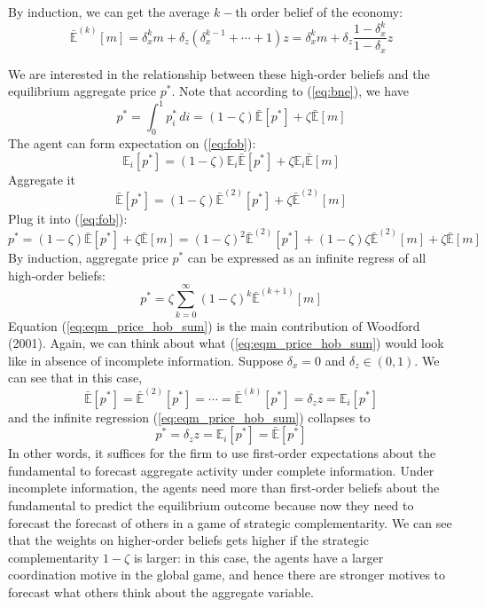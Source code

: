 \documentclass[12pt]{article}
\begin{document}
By induction, we can get the average $k-$th order belief of the economy:
\begin{equation}
	\bar{\mathbb{E}}^{(k)}[m] = \delta_x^k m + \delta_z(\delta_x^{k-1} + \cdots + 1)z = \delta_x^k m + \delta_z \frac{1 - \delta_x^{k}}{1-\delta_x}z
\end{equation}

We are interested in the relationship between these high-order beliefs and the equilibrium aggregate price $p^*$. Note that according to (\ref{eq:bne}), we have
\begin{equation} \label{eq:fob}
	p^* = \int_0^1 p_i^* \, di = (1-\zeta) \bar{\mathbb{E}}[p^*] + \zeta \bar{\mathbb{E}}[m]
\end{equation}
The agent can form expectation on (\ref{eq:fob}):
\begin{equation}
	\mathbb{E}_i[p^*] = (1-\zeta) \mathbb{E}_i\bar{\mathbb{E}}[p^*] + \zeta \mathbb{E}_i\bar{\mathbb{E}}[m]
\end{equation} 
Aggregate it
\[\bar{\mathbb{E}}[p^*] = (1-\zeta) \bar{\mathbb{E}}^{(2)}[p^*] + \zeta \bar{\mathbb{E}}^{(2)}[m]\]
Plug it into (\ref{eq:fob}):
\begin{equation}
	p^* =(1-\zeta) \bar{\mathbb{E}}[p^*] + \zeta \bar{\mathbb{E}}[m] = (1-\zeta)^2 \bar{\mathbb{E}}^{(2)}[p^*] + (1-\zeta)\zeta \bar{\mathbb{E}}^{(2)}[m] + \zeta \bar{\mathbb{E}}[m]
\end{equation}
By induction, aggregate price $p^*$ can be expressed as an infinite regress of all high-order beliefs:
\begin{equation} \label{eq:eqm_price_hob_sum}
	p^* = \zeta \sum_{k=0}^{\infty} (1-\zeta)^k \bar{\mathbb{E}}^{(k+1)}[m]
\end{equation}
Equation (\ref{eq:eqm_price_hob_sum}) is the main contribution of Woodford (2001). Again, we can think about what (\ref{eq:eqm_price_hob_sum}) would look like in absence of incomplete information. Suppose $\delta_x = 0$ and $\delta_z \in (0,1)$. We can see that in this case,
\[\bar{\mathbb{E}}[p^*] =\bar{\mathbb{E}}^{(2)}[p^*] = \cdots = \bar{\mathbb{E}}^{(k)}[p^*] = \delta_z z = \mathbb{E}_i[p^*] \] 
and the infinite regression (\ref{eq:eqm_price_hob_sum}) collapses to 
\[p^* = \delta_z z = \mathbb{E}_i[p^*] = \bar{\mathbb{E}}[p^*]\]
In other words, it suffices for the firm to use first-order expectations about the fundamental to forecast aggregate activity under complete information. Under incomplete information, the agents need more than first-order beliefs about the fundamental to predict the equilibrium outcome because now they need to forecast the forecast of others in a game of strategic complementarity. We can see that the weights on higher-order beliefs gets higher if the strategic complementarity $1-\zeta$ is larger: in this case, the agents have a larger coordination motive in the global game, and hence there are stronger motives to forecast what others think about the aggregate variable. 
\end{document}
